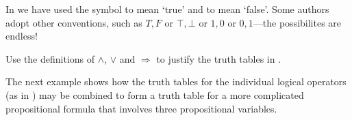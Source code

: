 In  we have used the symbol \TT{}  to mean `true' and \FF{}  to mean `false'. Some authors adopt other conventions, such as $T,F$ or $\top,\bot$  or $1,0$ or $0,1$---the possibilites are endless!

\begin{exercise}
Use the definitions of $\wedge$, $\vee$ and $\Rightarrow$ to justify the truth tables in .
\end{exercise}

The next example shows how the truth tables for the individual logical operators (as in ) may be combined to form a truth table for a more complicated propositional formula that involves three propositional variables.

